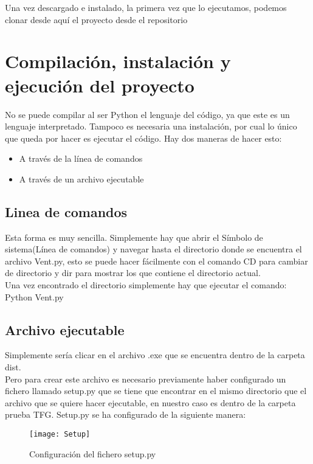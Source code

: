 Una vez descargado e instalado, la primera vez que lo ejecutamos, podemos clonar desde aquí el proyecto desde el repositorio

\section{Compilación, instalación y ejecución del proyecto}
No se puede compilar al ser Python el lenguaje del código, ya que este es un lenguaje interpretado. Tampoco es necesaria una instalación, por cual lo único que queda por hacer es ejecutar el código.
Hay dos maneras de hacer esto:\\

\begin{itemize}
	\item A través de la línea de comandos
	\item A través de un archivo ejecutable
\end{itemize}


\subsection{Linea de comandos}
Esta forma es muy sencilla. Simplemente hay que abrir el Símbolo de sistema(Línea de comandos) y navegar hasta el directorio donde se encuentra el archivo Vent.py, esto se puede hacer fácilmente con el comando CD para cambiar de directorio y dir para mostrar los que contiene el directorio actual.\\
Una vez encontrado el directorio simplemente hay que ejecutar el comando: Python Vent.py\\

\subsection{Archivo ejecutable}
Simplemente sería clicar en el archivo .exe que se encuentra dentro de la carpeta dist.\\

Pero para crear este archivo es necesario previamente haber configurado un fichero llamado setup.py que se tiene que encontrar en el mismo directorio que el archivo que se quiere hacer ejecutable, en nuestro caso es dentro de la carpeta prueba TFG. Setup.py se ha configurado de la siguiente manera: \\

\begin{figure}[H]
\centering
\texttt{[image: Setup]}
\caption{Configuración del fichero setup.py}
\end{figure}

